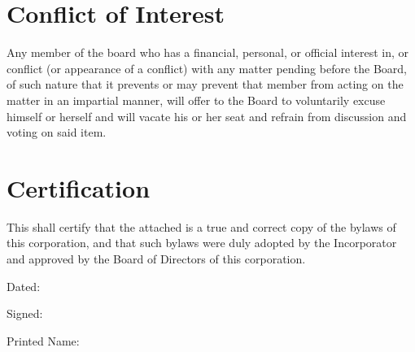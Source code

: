 \documentclass{article}
\begin{document}
\section{Conflict of Interest}
Any member of the board who has a financial, personal, or official interest in, or conflict 
(or appearance of a conflict) with any matter pending before the Board, of such nature that it 
prevents or may prevent that member from acting on the matter in an impartial manner, 
will offer to the Board to voluntarily excuse himself or herself and will vacate his or her seat 
and refrain from discussion and voting on said item.
\section{Certification}
This shall certify that the attached is a true and correct copy of the bylaws of this 
corporation, and that such bylaws were duly adopted by the Incorporator and approved by 
the Board of Directors of this corporation.

Dated:

Signed:

Printed Name:
\end{document}
